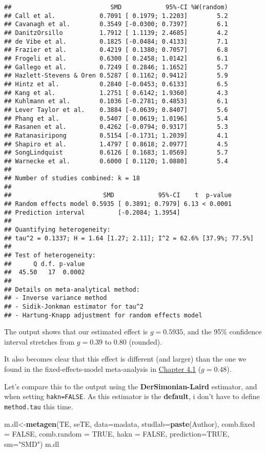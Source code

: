 \documentclass[]{book}
\newenvironment{Shaded}{\begin{snugshade}}{\end{snugshade}}
\newcommand{\KeywordTok}[1]{\textcolor[rgb]{0.13,0.29,0.53}{\textbf{#1}}}
\newcommand{\DataTypeTok}[1]{\textcolor[rgb]{0.13,0.29,0.53}{#1}}
\newcommand{\StringTok}[1]{\textcolor[rgb]{0.31,0.60,0.02}{#1}}
\newcommand{\OtherTok}[1]{\textcolor[rgb]{0.56,0.35,0.01}{#1}}
\newcommand{\NormalTok}[1]{#1}
\theoremstyle{definition}
\theoremstyle{definition}
\theoremstyle{definition}
\theoremstyle{remark}
\begin{document}
\begin{verbatim}
##                           SMD            95%-CI %W(random)
## Call et al.            0.7091 [ 0.1979; 1.2203]        5.2
## Cavanagh et al.        0.3549 [-0.0300; 0.7397]        6.1
## DanitzOrsillo          1.7912 [ 1.1139; 2.4685]        4.2
## de Vibe et al.         0.1825 [-0.0484; 0.4133]        7.1
## Frazier et al.         0.4219 [ 0.1380; 0.7057]        6.8
## Frogeli et al.         0.6300 [ 0.2458; 1.0142]        6.1
## Gallego et al.         0.7249 [ 0.2846; 1.1652]        5.7
## Hazlett-Stevens & Oren 0.5287 [ 0.1162; 0.9412]        5.9
## Hintz et al.           0.2840 [-0.0453; 0.6133]        6.5
## Kang et al.            1.2751 [ 0.6142; 1.9360]        4.3
## Kuhlmann et al.        0.1036 [-0.2781; 0.4853]        6.1
## Lever Taylor et al.    0.3884 [-0.0639; 0.8407]        5.6
## Phang et al.           0.5407 [ 0.0619; 1.0196]        5.4
## Rasanen et al.         0.4262 [-0.0794; 0.9317]        5.3
## Ratanasiripong         0.5154 [-0.1731; 1.2039]        4.1
## Shapiro et al.         1.4797 [ 0.8618; 2.0977]        4.5
## SongLindquist          0.6126 [ 0.1683; 1.0569]        5.7
## Warnecke et al.        0.6000 [ 0.1120; 1.0880]        5.4
## 
## Number of studies combined: k = 18
## 
##                         SMD            95%-CI    t  p-value
## Random effects model 0.5935 [ 0.3891; 0.7979] 6.13 < 0.0001
## Prediction interval         [-0.2084; 1.3954]              
## 
## Quantifying heterogeneity:
## tau^2 = 0.1337; H = 1.64 [1.27; 2.11]; I^2 = 62.6% [37.9%; 77.5%]
## 
## Test of heterogeneity:
##      Q d.f. p-value
##  45.50   17  0.0002
## 
## Details on meta-analytical method:
## - Inverse variance method
## - Sidik-Jonkman estimator for tau^2
## - Hartung-Knapp adjustment for random effects model
\end{verbatim}

The output shows that our estimated effect is \(g=0.5935\), and the 95\%
confidence interval stretches from \(g=0.39\) to \(0.80\) (rounded).

It also becomes clear that this effect is different (and larger) than
the one we found in the fixed-effects-model meta-analysis in
\protect\hyperlink{fixed}{Chapter 4.1} (\(g=0.48\)).

Let's compare this to the output using the \textbf{DerSimonian-Laird}
estimator, and when setting \texttt{hakn=FALSE}. As this estimator is
the \textbf{default}, i don't have to define \texttt{method.tau} this
time.

\begin{Shaded}
\begin{Highlighting}[]
\NormalTok{m.dl<-}\KeywordTok{metagen}\NormalTok{(TE,}
\NormalTok{        seTE,}
        \DataTypeTok{data=}\NormalTok{madata,}
        \DataTypeTok{studlab=}\KeywordTok{paste}\NormalTok{(Author),}
        \DataTypeTok{comb.fixed =} \OtherTok{FALSE}\NormalTok{,}
        \DataTypeTok{comb.random =} \OtherTok{TRUE}\NormalTok{,}
        \DataTypeTok{hakn =} \OtherTok{FALSE}\NormalTok{,}
        \DataTypeTok{prediction=}\OtherTok{TRUE}\NormalTok{,}
        \DataTypeTok{sm=}\StringTok{"SMD"}\NormalTok{)}
\NormalTok{m.dl}
\end{Highlighting}
\end{Shaded}
\end{document}
